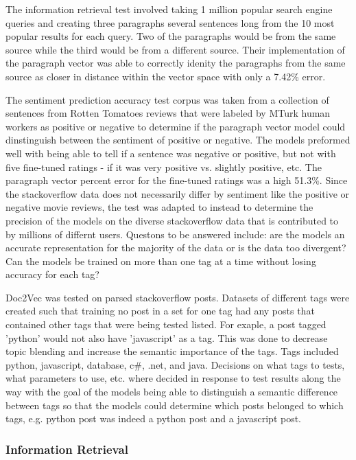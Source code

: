 The information retrieval test involved taking 1 million popular search engine queries and creating three paragraphs several sentences long from the 10 most popular results for each query. Two of the paragraphs would be from the same source while the third would be from a different source. Their implementation of the paragraph vector was able to correctly idenity the paragraphs from the same source as closer in distance within the vector space with only a 7.42\% error. 

The sentiment prediction accuracy test corpus was taken from a collection of sentences from Rotten Tomatoes reviews that were labeled by MTurk human workers as positive or negative to determine if the paragraph vector model could dinstinguish between the sentiment of positive or negative. The models preformed well with being able to tell if a sentence was negative or positive, but not with five fine-tuned ratings - if it was very positive vs. slightly positive, etc. The paragraph vector percent error for the fine-tuned ratings was a high 51.3\%. Since the stackoverflow data does not necessarily differ by sentiment like the positive or negative movie reviews, the test was adapted to instead to determine the precision of the models on the diverse stackoverflow data that is contributed to by millions of differnt users. Questons to be answered include: are the models an accurate representation for the majority of the data or is the data too divergent? Can the models be trained on more than one tag at a time without losing accuracy for each tag?

Doc2Vec was tested on parsed stackoverflow posts. Datasets of different tags were created such that training no post in a set for one tag had any posts that contained other tags that were being tested listed. For exaple, a post tagged 'python' would not also have 'javascript' as a tag. This was done to decrease topic blending and increase the semantic importance of the tags. Tags included python, javascript, database, c\#, .net, and java. Decisions on what tags to tests, what parameters to use, etc. where decided in response to test results along the way with the goal of the models being able to distinguish a semantic difference between tags so that the models could determine which posts belonged to which tags, e.g. python post was indeed a python post and a javascript post.

\subsubsection{Information Retrieval}

